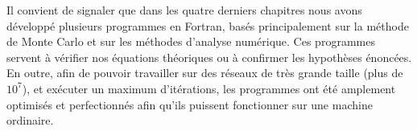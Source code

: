 Il convient de signaler que dans les quatre derniers chapitres nous avons développé plusieurs programmes en Fortran, basés principalement sur la méthode de Monte Carlo et sur les méthodes d'analyse numérique. Ces programmes servent à vérifier nos équations théoriques ou à confirmer les hypothèses énoncées. En outre, afin de pouvoir travailler sur des réseaux de très grande taille (plus de $10^7$), et exécuter un maximum d'itérations, les programmes ont été amplement optimisés et perfectionnés afin qu'ils puissent fonctionner sur une machine ordinaire. 




 